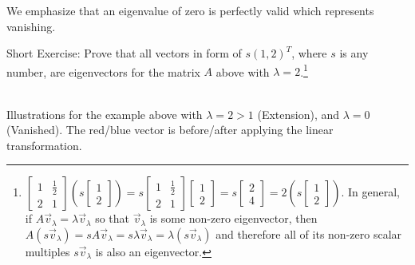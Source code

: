 We emphasize that an eigenvalue of zero is perfectly valid which represents vanishing. \par
Short Exercise: Prove that all vectors in form of $s(1,2)^T$, where $s$ is any number, are eigenvectors for the matrix $A$ above with $\lambda = 2$.\footnote{
$
\begin{bmatrix}
1 & \frac{1}{2} \\
2 & 1
\end{bmatrix}
\left(s
\begin{bmatrix}
1 \\
2 
\end{bmatrix}\right)
=
s\begin{bmatrix}
1 & \frac{1}{2} \\
2 & 1
\end{bmatrix}
\begin{bmatrix}
1 \\
2 
\end{bmatrix}
=
s
\begin{bmatrix}
2 \\
4
\end{bmatrix}
=
2\left(s
\begin{bmatrix}
1 \\
2 
\end{bmatrix}\right)
$. In general, if $A\vec{v}_\lambda = \lambda\vec{v}_\lambda$ so that $\vec{v}_\lambda$ is some non-zero eigenvector, then $A(s\vec{v}_\lambda) = sA\vec{v}_\lambda = s\lambda\vec{v}_\lambda = \lambda(s\vec{v}_\lambda)$ and therefore all of its non-zero scalar multiples $s\vec{v}_\lambda$ is also an eigenvector.}
\begin{center}
\\
Illustrations for the example above with $\lambda = 2 > 1$ (Extension), and $\lambda = 0$ (Vanished). The red/blue vector is before/after applying the linear transformation.
\end{center}
